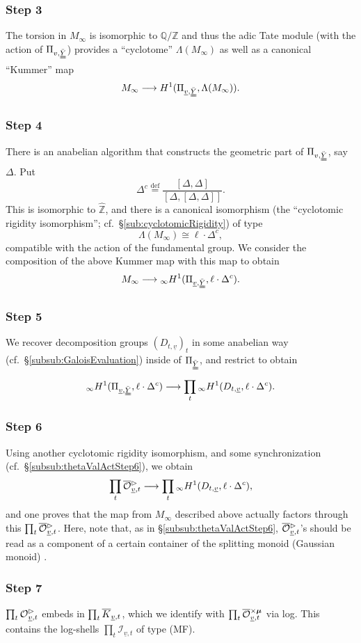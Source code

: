 \documentclass[12pt, reqno, a4paper]{amsart}
\def\udl#1{\underline{#1}} %
\def\what#1{\widehat{#1}} %
\def\longto{\longrightarrow}
\def\eqdef{\stackrel{\textrm{def}}{=}} %
\def\bZ{\mathbb{Z}} %
\def\bQ{\mathbb{Q}} %
\def\cI{{\mathcal{I}}}
\def\hbZ{\what{\bZ}} %
\def\uv{\udl{v}} %
\def\La{\Lambda} %
\def\infH{{}_{\infty}H} %
\begin{document}
\subsubsection{Step 3}
The torsion in $M_\infty$ is isomorphic to $\bQ/\bZ$ and thus the adic Tate module (with the action of $\Pi_{v,\dduuY}$) provides a ``cyclotome'' $\La(M_\infty)$ as well as a canonical ``Kummer'' map
\[ M_\infty \longto H^1(\Pi_{\uv,\dduuY},\La(M_\infty)). \]

\subsubsection{Step 4}
There is an anabelian algorithm that constructs the geometric part of $\Pi_{v,\dduuY}$, say $\Delta$. 
Put 
\[ \Delta^c \eqdef \frac{[\Delta,\Delta]}{[\Delta,[\Delta,\Delta]]}. \]
This is isomorphic to $\hbZ$, and there is a canonical isomorphism (the ``cyclotomic rigidity isomorphism''; cf.\ \S\ref{sub:cyclotomicRigidity}) of type
\[ \La(M_\infty) \cong \ell \cdot \Delta^c, \]
compatible with the action of the fundamental group.
We consider the composition of the above Kummer map with this map to obtain 
\[ M_\infty \longto \infH^1(\Pi_{\uv,\dduuY}, \ell \cdot \Delta^c). \]

\subsubsection{Step 5}
We recover decomposition groups $(D_{t,\uv})_t$ in some anabelian way (cf.\ \S\ref{subsub:GaloisEvaluation}) inside of $\Pi_{\dduuY}$, and restrict to obtain 
\[ \infH^1(\Pi_{\uv,\dduuY},\ell \cdot \Delta^c) \longto \prod_t \infH^1(D_{t,\uv},\ell \cdot \Delta^c). \]

\subsubsection{Step 6}
Using another cyclotomic rigidity isomorphism, and some synchronization (cf.\ \S\ref{subsub:thetaValActStep6}), we obtain \[ \prod_t \oOOt_{\uv,t} \longto \prod_t \infH^1(D_{t,\uv},\ell \cdot \Delta^c), \] and one proves that the map from $M_\infty$ described above actually factors through this $\prod_t \oOOt_{\uv,t}$. 
Here, note that, as in \S\ref{subsub:thetaValActStep6}, $\oOOt_{\uv,t}$'s should be read as a component of a certain container of the splitting monoid (Gaussian monoid) \cite[Cor.\ 4.10(i), pp.\ 384--385]{MR4225474}.

\subsubsection{Step 7}
$\prod_t \OOt_{\uv,t}$ embeds in $\prod_t \oK_{\uv,t}$, which we identify with $\prod_t \oOOxmu_{\uv,t}$ via log.
This contains the log-shells $\prod_t \cI_{\uv,t}$ of type (MF).
\end{document}
